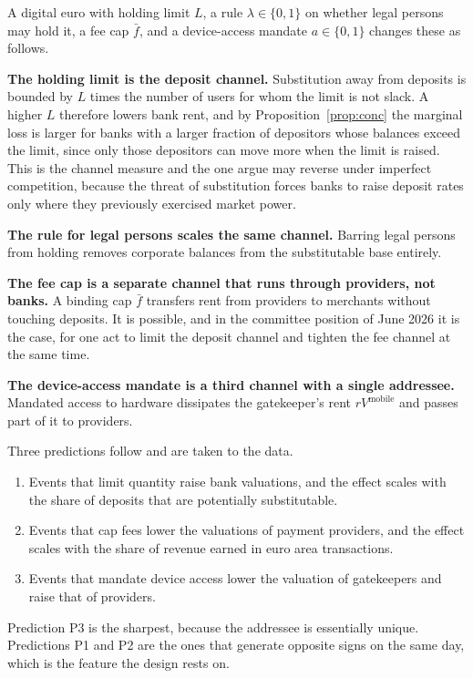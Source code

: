 \documentclass[11pt]{article}
\theoremstyle{plain}\newtheorem{proposition}{Proposition}
\begin{document}
A digital euro with holding limit $L$, a rule $\lambda\in\{0,1\}$ on whether legal persons may hold it, a fee cap $\bar f$, and a device-access mandate $a\in\{0,1\}$ changes these as follows.

\textbf{The holding limit is the deposit channel.} Substitution away from deposits is bounded by $L$ times the number of users for whom the limit is not slack. A higher $L$ therefore lowers bank rent, and by Proposition~\ref{prop:conc} the marginal loss is larger for banks with a larger fraction of depositors whose balances exceed the limit, since only those depositors can move more when the limit is raised. This is the channel \citet{burlon2024} measure and the one \citet{chiu2023} argue may reverse under imperfect competition, because the threat of substitution forces banks to raise deposit rates only where they previously exercised market power.

\textbf{The rule for legal persons scales the same channel.} Barring legal persons from holding removes corporate balances from the substitutable base entirely.

\textbf{The fee cap is a separate channel that runs through providers, not banks.} A binding cap $\bar f$ transfers rent from providers to merchants without touching deposits. It is possible, and in the committee position of June 2026 it is the case, for one act to limit the deposit channel and tighten the fee channel at the same time.

\textbf{The device-access mandate is a third channel with a single addressee.} Mandated access to hardware dissipates the gatekeeper's rent $rV^{\mathrm{mobile}}$ and passes part of it to providers.

Three predictions follow and are taken to the data.

\begin{enumerate}\itemsep2pt
\item[P1] Events that limit quantity raise bank valuations, and the effect scales with the share of deposits that are potentially substitutable.
\item[P2] Events that cap fees lower the valuations of payment providers, and the effect scales with the share of revenue earned in euro area transactions.
\item[P3] Events that mandate device access lower the valuation of gatekeepers and raise that of providers.
\end{enumerate}
\noindent Prediction P3 is the sharpest, because the addressee is essentially unique. Predictions P1 and P2 are the ones that generate opposite signs on the same day, which is the feature the design rests on.
\end{document}
